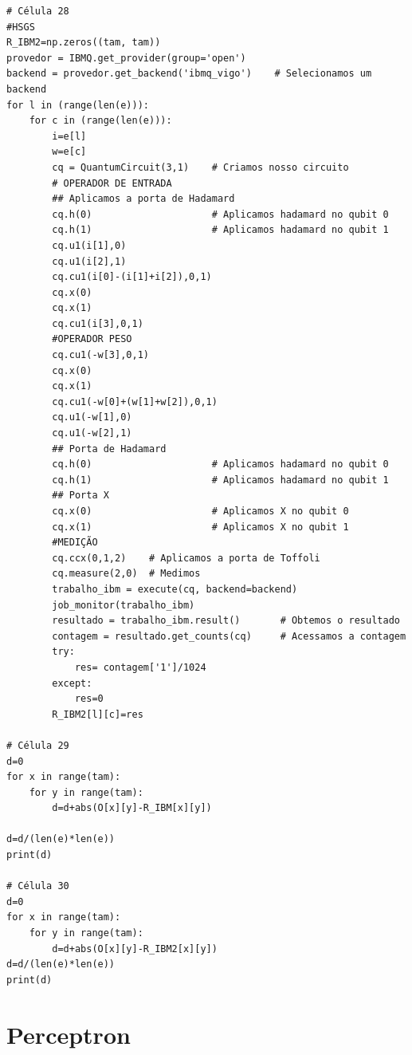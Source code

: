 \begin{verbatim}
# Célula 28
#HSGS
R_IBM2=np.zeros((tam, tam))
provedor = IBMQ.get_provider(group='open')          
backend = provedor.get_backend('ibmq_vigo')    # Selecionamos um backend
for l in (range(len(e))):
    for c in (range(len(e))):
        i=e[l]
        w=e[c]
        cq = QuantumCircuit(3,1)    # Criamos nosso circuito        
        # OPERADOR DE ENTRADA
        ## Aplicamos a porta de Hadamard
        cq.h(0)                     # Aplicamos hadamard no qubit 0
        cq.h(1)                     # Aplicamos hadamard no qubit 1     
        cq.u1(i[1],0)
        cq.u1(i[2],1)
        cq.cu1(i[0]-(i[1]+i[2]),0,1)
        cq.x(0)
        cq.x(1)
        cq.cu1(i[3],0,1)
        #OPERADOR PESO
        cq.cu1(-w[3],0,1)
        cq.x(0)
        cq.x(1)
        cq.cu1(-w[0]+(w[1]+w[2]),0,1)
        cq.u1(-w[1],0)
        cq.u1(-w[2],1)
        ## Porta de Hadamard
        cq.h(0)                     # Aplicamos hadamard no qubit 0
        cq.h(1)                     # Aplicamos hadamard no qubit 1
        ## Porta X
        cq.x(0)                     # Aplicamos X no qubit 0
        cq.x(1)                     # Aplicamos X no qubit 1
        #MEDIÇÃO
        cq.ccx(0,1,2)    # Aplicamos a porta de Toffoli
        cq.measure(2,0)  # Medimos
        trabalho_ibm = execute(cq, backend=backend)    
        job_monitor(trabalho_ibm)
        resultado = trabalho_ibm.result()       # Obtemos o resultado
        contagem = resultado.get_counts(cq)     # Acessamos a contagem
        try:
            res= contagem['1']/1024
        except:
            res=0
        R_IBM2[l][c]=res

# Célula 29
d=0
for x in range(tam):
    for y in range(tam):
        d=d+abs(O[x][y]-R_IBM[x][y])
        
d=d/(len(e)*len(e))
print(d)

# Célula 30
d=0
for x in range(tam):
    for y in range(tam):
        d=d+abs(O[x][y]-R_IBM2[x][y])
d=d/(len(e)*len(e))
print(d)
\end{verbatim}
\section{Perceptron}
